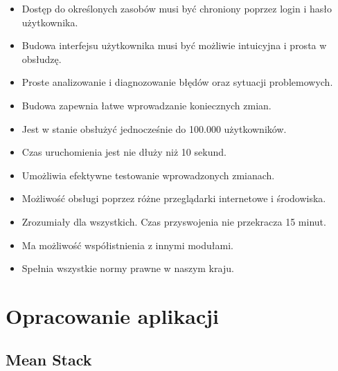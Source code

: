 \documentclass[12pt]{report}
\begin{document}
\begin{itemize}
\item Dostęp do określonych zasobów musi być chroniony poprzez login i hasło użytkownika.
\item Budowa interfejsu użytkownika musi być możliwie intuicyjna i prosta w obsłudzę.
\item Proste analizowanie i diagnozowanie błędów oraz sytuacji problemowych.
\item Budowa zapewnia łatwe wprowadzanie koniecznych zmian.
\item Jest w stanie obsłużyć jednocześnie do 100.000 użytkowników.
\item Czas uruchomienia jest nie dłuży niż 10 sekund.
\item Umożliwia efektywne testowanie wprowadzonych zmianach.
\item Możliwość obsługi poprzez różne przeglądarki internetowe i środowiska.
\item Zrozumiały dla wszystkich. Czas przyswojenia nie przekracza 15 minut.
\item Ma możliwość współistnienia z innymi modułami.
\item Spełnia wszystkie normy prawne w naszym kraju.
\end{itemize}

\chapter{Opracowanie aplikacji}

\section{Mean Stack}
\end{document}
